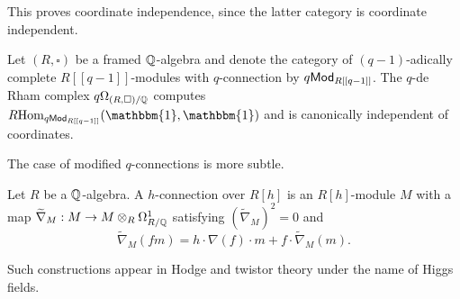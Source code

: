 This proves coordinate independence, since the latter category is coordinate independent.
\begin{corollary}\label{corr: modules with q-connection are coordinate independent}
    Let $(R,\square)$ be a framed $\mathbb{Q}$-algebra and denote the category of $(q-1)$-adically complete $R[[q-1]]$-modules with $q$-connection by $q\mathsf{Mod}_{R[[q-1]]}$. The $q$-de Rham complex $q\Omega_{(R,\square)/\mathbb{Q}}$ computes $R\Hom_{q\Mod_{R[[q-1]]}}(\mathbbm{1},\mathbbm{1})$ and is canonically independent of coordinates. 
\end{corollary}

The case of modified $q$-connections is more subtle. 
\begin{definition}\label{def: logarithmic q-connection}
    Let $R$ be a $\mathbb{Q}$-algebra. A $h$-connection over $R[h]$ is an $R[h]$-module $M$ with a map $\widetilde{\nabla}_{M}:M\to M\otimes_{R}\Omega^{1}_{R/\mathbb{Q}}$ satisfying $(\widetilde{\nabla}_{M})^{2}=0$ and 
    $$\widetilde{\nabla}_{M}(fm)=h\cdot\nabla(f)\cdot m+f\cdot\widetilde{\nabla}_{M}(m).$$
\end{definition}
Such constructions appear in Hodge and twistor theory under the name of Higgs fields. 

